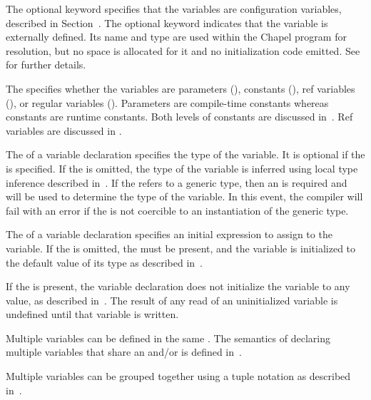 The optional keyword  specifies that the variables are
configuration variables, described in
Section~.  The optional keyword 
indicates that the variable is externally defined.  Its name and type are used
within the Chapel program for resolution, but no space is allocated for it and
no initialization code emitted.
See  for further details.

The  specifies whether the variables are
parameters (), constants (),
ref variables (), or regular
variables ().  Parameters are compile-time constants whereas
constants are runtime constants.  Both levels of constants are
discussed in~.
Ref variables are discussed in .

The  of a variable declaration specifies the type of
the variable.  It is optional if the  is
specified.  If the  is omitted, the type of the
variable is inferred using local type inference described
in~. If the  refers
to a generic type, then an  is required
and will be used to determine the type of the variable. In this event,
the compiler will fail with an error if the  is
not coercible to an instantiation of the generic type.

The  of a variable declaration specifies an
initial expression to assign to the variable.  If
the  is omitted, the  must
be present, and the variable is initialized to the default value of
its type as described in~.

If the  is present, the variable
declaration does not initialize the variable to any value, as
described in~. The result of any read of an
uninitialized variable is undefined until that variable is written.

Multiple variables can be defined in the
same .  The semantics of declaring
multiple variables that share an 
and/or  is defined in~.

Multiple variables can be grouped together using a tuple notation as
described in~.

